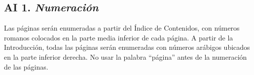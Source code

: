 \subsection*{AI 1. \textit{Numeración}}

Las páginas serán enumeradas a partir del Índice de Contenidos, con números romanos colocados en la parte media inferior de cada página. A partir de la Introducción, todas las páginas serán enumeradas con números arábigos ubicados en la parte inferior derecha. No usar la palabra “página” antes de la numeración de las páginas.
